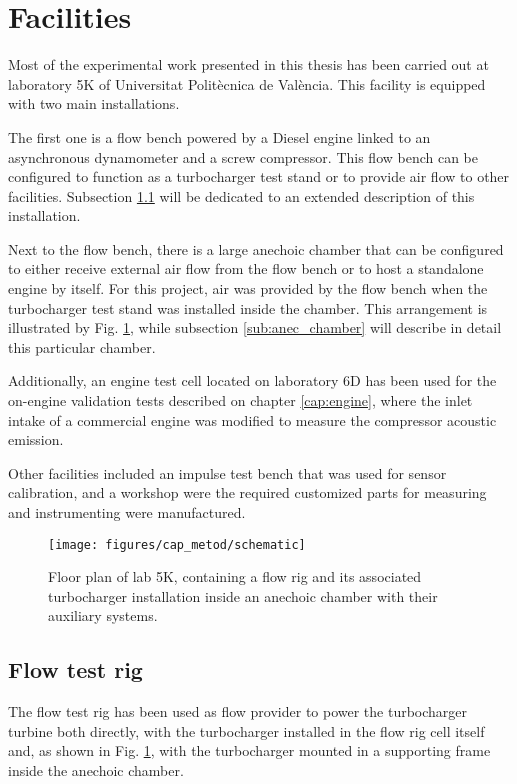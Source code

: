 \section{Facilities}

Most of the experimental work presented in this thesis has been carried out at laboratory 5K of Universitat Politècnica de València. This facility is equipped with two main installations.

The first one is a flow bench powered by a Diesel engine linked to an asynchronous dynamometer and a screw compressor. This flow bench can be configured to function as a turbocharger test stand or to provide air flow to other facilities. Subsection \ref{sub:flow_bench} will be dedicated to an extended description of this installation.

Next to the flow bench, there is a large anechoic chamber that can be configured to either receive external air flow from the flow bench or to host a standalone engine by itself. For this project, air was provided by the flow bench when the turbocharger test stand was installed inside the chamber. This arrangement is illustrated by Fig. \ref{fig:floorplan}, while subsection \ref{sub:anec_chamber} will describe in detail this particular chamber.

Additionally, an engine test cell located on laboratory 6D has been used for the on-engine validation tests described on chapter \ref{cap:engine}, where the inlet intake of a commercial engine was modified to measure the compressor acoustic emission.

Other facilities included an impulse test bench that was used for sensor calibration, and a workshop were the required customized parts for measuring and instrumenting were manufactured.

\begin{figure}[t!]
\centering
\texttt{[image: figures/cap\_metod/schematic]}
\caption[Floor plan of laboratory 5K]{Floor plan of lab 5K, containing a flow rig and its associated turbocharger installation inside an anechoic chamber with their auxiliary systems.}
\label{fig:floorplan}
\end{figure}

\subsection{Flow test rig} \label{sub:flow_bench}

The flow test rig has been used as flow provider to power the turbocharger turbine both directly, with the turbocharger installed in the flow rig cell itself and, as shown in Fig. \ref{fig:floorplan}, with the turbocharger mounted in a supporting frame inside the anechoic chamber.


